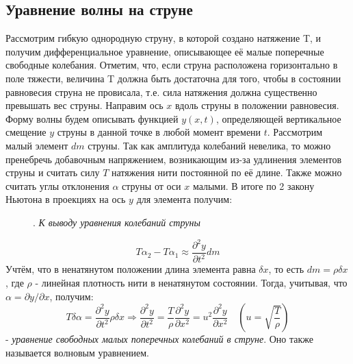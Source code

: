 \subsection{Уравнение волны на струне}
Рассмотрим гибкую однородную струну, в которой создано натяжение T, и получим дифференциальное уравнение, описывающее её малые
поперечные свободные колебания. Отметим, что, если струна расположена
горизонтально в поле тяжести, величина T должна быть достаточна для
того, чтобы в состоянии равновесия струна не провисала, т.е. сила натяжения должна существенно превышать вес струны.
\noindent
Направим ось $x$ вдоль струны в положении равновесия. Форму волны будем описывать функцией $y(x,t)$, определяющей вертикальное смещение $y$ струны в данной точке в любой момент времени $t$. Рассмотрим малый элемент $dm$ струны. Так как амплитуда колебаний невелика, то можно пренебречь добавочным напряжением, возникающим из-за удлинения элементов струны и считать силу $T$ натяжения нити постоянной по её длине. Также можно считать углы отклонения $\alpha$ струны от оси $x$ малыми. В итоге по 2 закону Ньютона в проекциях на ось $y$ для элемента получим:
\begin{figure}
\caption{. \textit{К выводу уравнения колебаний струны}}
\end{figure}
\begin{equation}
T \alpha_2 - T \alpha_1 \approx \frac{\partial^2 y}{\partial t^2} dm
\end{equation}
Учтём, что в ненатянутом положении длина элемента равна $\delta x$, то есть $dm = \rho \delta x$, где $\rho$ - линейная плотность нити в ненатянутом состоянии. Тогда, учитывая, что $\alpha = \partial y/\partial x$, получим:
\begin{equation}
T\delta \alpha = \frac{\partial^2 y}{\partial t^2} \rho \delta x \Rightarrow \frac{\partial^2 y}{\partial t^2} = \frac{T}{\rho} \frac{\partial^2 y}{\partial x^2} = u^2 \frac{\partial^2 y}{\partial x^2} \quad \left(u = \sqrt{\frac{T}{\rho}}\right)
\end{equation} 
- \textit{уравнение свободных малых поперечных колебаний в струне}. Оно также называется волновым уравнением.

